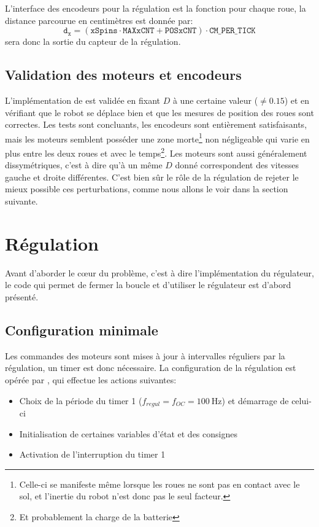 L'interface des encodeurs pour la régulation est la fonction  pour chaque roue, la distance parcourue en centimètres est donnée par:
\[
  \mathtt{d_x} = (\mathtt{xSpins} \cdot \mathtt{MAXxCNT} + \mathtt{POSxCNT})\cdot\mathtt{CM\_PER\_TICK}
\]
 sera donc la sortie du capteur de la régulation.



\subsection{Validation des moteurs et encodeurs\label{sec:validMotor}}
L'implémentation de  est validée en fixant $D$ à une certaine valeur ($\neq 0.15$) et en vérifiant que le robot se déplace bien et que les mesures de position des roues sont correctes. Les tests sont concluants, les encodeurs sont entièrement satisfaisants, mais les moteurs semblent posséder une zone morte\footnote{Celle-ci se manifeste même lorsque les roues ne sont pas en contact avec le sol, et l'inertie du robot n'est donc pas le seul facteur.} non négligeable qui varie en plus entre les deux roues et avec le temps\footnote{Et probablement la charge de la batterie}. Les moteurs sont aussi généralement dissymétriques, c'est à dire qu'à un même $D$ donné correspondent des vitesses gauche et droite différentes. C'est bien sûr le rôle de la régulation de rejeter le mieux possible ces perturbations, comme nous allons le voir dans la section suivante.

\section{Régulation}
Avant d'aborder le c\oe{}ur du problème, c'est à dire l'implémentation du régulateur, le code qui permet de fermer la boucle et d'utiliser le régulateur est d'abord présenté.
\subsection{Configuration minimale}
Les commandes des moteurs sont mises à jour à intervalles réguliers par la régulation, un timer est donc nécessaire. La configuration de la régulation est opérée par , qui effectue les actions suivantes:
\begin{itemize}
  \item Choix de la période du timer 1 ($f_{regul} = f_{OC} = \SI{100}{\hertz}$) et démarrage de celui-ci
  \item Initialisation de certaines variables d'état et des consignes
  \item Activation de l'interruption du timer 1
\end{itemize}

